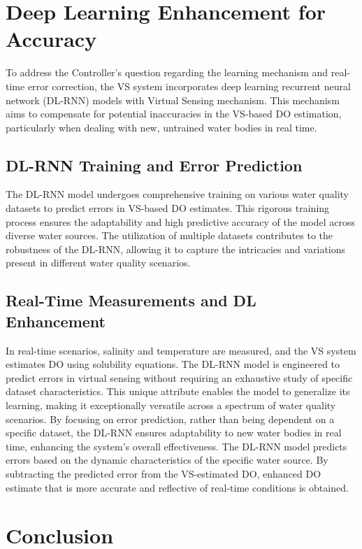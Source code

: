 \documentclass[a4paper, 11pt]{article}
\begin{document}
	\section*{Deep Learning Enhancement for Accuracy}
	
	To address the Controller's question regarding the learning mechanism and real-time error correction, the VS system incorporates deep learning recurrent neural network (DL-RNN) models with Virtual Sensing mechanism. This mechanism aims to compensate for potential inaccuracies in the VS-based DO estimation, particularly when dealing with new, untrained water bodies in real time.
	
	\subsection*{DL-RNN Training and Error Prediction}
	
	The DL-RNN model undergoes comprehensive training on various water quality datasets to predict errors in VS-based DO estimates. This rigorous training process ensures the adaptability and high predictive accuracy of the model across diverse water sources. The utilization of multiple datasets contributes to the robustness of the DL-RNN, allowing it to capture the intricacies and variations present in different water quality scenarios.

	
	\subsection*{Real-Time Measurements and DL Enhancement}
	
	In real-time scenarios, salinity and temperature are measured, and the VS system estimates DO using solubility equations. The DL-RNN model is engineered to predict errors in virtual sensing without requiring an exhaustive study of specific dataset characteristics. This unique attribute enables the model to generalize its learning, making it exceptionally versatile across a spectrum of water quality scenarios. By focusing on error prediction, rather than being dependent on a specific dataset, the DL-RNN ensures adaptability to new water bodies in real time, enhancing the system's overall effectiveness. The DL-RNN model predicts errors based on the dynamic characteristics of the specific water source. By subtracting the predicted error from the VS-estimated DO, enhanced DO estimate that is more accurate and reflective of real-time conditions is obtained.
	
	
	\section*{Conclusion}
	
\end{document}
